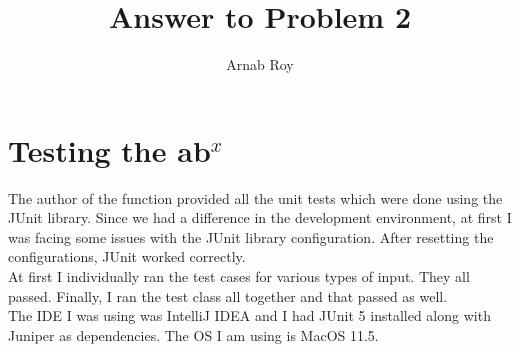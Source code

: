 \documentclass[12pt]{article}
\title{Answer to Problem 2}
\author{Arnab Roy}
\begin{document}
\maketitle

\section{Testing the ab$^x$}
The author of the function provided all the unit tests which were done using the JUnit library. Since we had a difference in the development environment, at first I was facing some issues with the JUnit library configuration. After resetting the configurations, JUnit worked correctly. \\
At first I individually ran the test cases for various types of input. They all passed. Finally, I ran the test class all together and that passed as well.\\
The IDE I was using was IntelliJ IDEA and I had JUnit 5 installed along with Juniper as dependencies. The OS I am using is MacOS 11.5.
\end{document}
